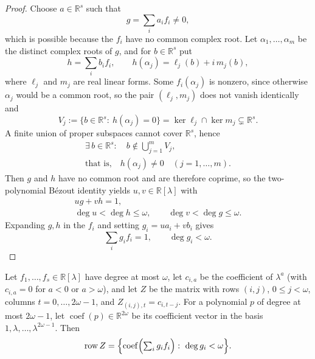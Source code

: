 \begin{proof}
	Choose $a\in\mathbb R^s$ such that
	\[
	g=\sum_i a_if_i\neq0,
	\]
	which is possible because the $f_i$ have no common complex root. Let
	$\alpha_1,\dots,\alpha_m$ be the distinct complex roots of $g$, and for
	$b\in\mathbb R^s$ put
	\[
	h=\sum_i b_if_i,\qquad
	h(\alpha_j)=\ell_j(b)+i\,m_j(b),
	\]
	where $\ell_j$ and $m_j$ are real linear forms. Some $f_i(\alpha_j)$ is
	nonzero, since otherwise $\alpha_j$ would be a common root, so the pair
	$(\ell_j,m_j)$ does not vanish identically and
	\[
	V_j:=\{b\in\mathbb R^s:\ h(\alpha_j)=0\}
	=\ker\ell_j\cap\ker m_j\subsetneq\mathbb R^s .
	\]
	A finite union of proper subspaces cannot cover $\mathbb R^s$, hence
	\[
	\begin{gathered}
	\exists\,b\in\mathbb R^s:\quad b\notin\bigcup_{j=1}^{m}V_j,\\
	\text{that is,}\quad h(\alpha_j)\neq0\quad (j=1,\dots,m).
	\end{gathered}
	\]
	Then $g$ and $h$ have no common root and are therefore coprime, so the
	two-polynomial B\'ezout identity yields $u,v\in\mathbb R[\lambda]$ with
	\[
	\begin{gathered}
	ug+vh=1,\\
	\deg u<\deg h\le\omega,\qquad \deg v<\deg g\le\omega .
	\end{gathered}
	\]
	Expanding $g,h$ in the $f_i$ and setting $g_i=ua_i+vb_i$ gives
	\[
	\sum_i g_i f_i=1,\qquad \deg g_i<\omega .
	\]
\end{proof}

\begin{lem}[Window]\label{lem:window}
	Let $f_1,\dots,f_s\in\mathbb R[\lambda]$ have degree at most $\omega$,
	let $c_{i,a}$ be the coefficient of $\lambda^a$ (with $c_{i,a}=0$ for
	$a<0$ or $a>\omega$), and let $Z$ be the matrix with rows $(i,j)$,
	$0\le j<\omega$, columns $t=0,\dots,2\omega-1$, and
	$Z_{(i,j),t}=c_{i,t-j}$. For a polynomial $p$ of degree at most
	$2\omega-1$, let $\operatorname{coef}(p)\in\mathbb R^{2\omega}$ be its
	coefficient vector in the basis $1,\lambda,\dots,\lambda^{2\omega-1}$.
	Then
	\[
	\operatorname{row}Z=
	\Bigl\{
	\operatorname{coef}\Bigl(\textstyle\sum_i g_if_i\Bigr)
	:\ \deg g_i<\omega
	\Bigr\}.
	\]
\end{lem}

